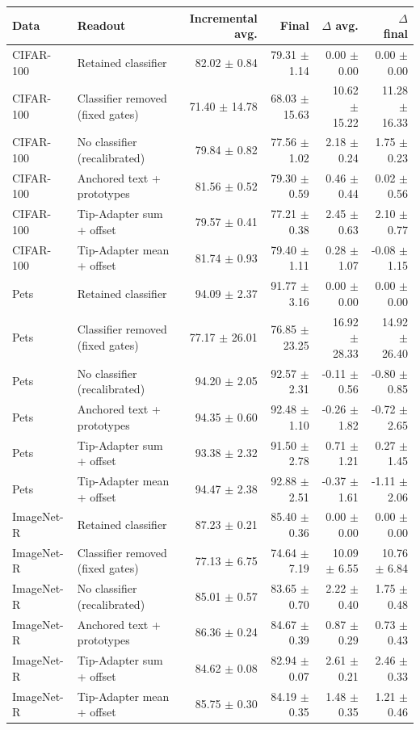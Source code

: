 \begin{tabular}{llrrrr}
\toprule
Data & Readout & Incremental avg. & Final & $\Delta$ avg. & $\Delta$ final \\
\midrule
CIFAR-100 & Retained classifier & 82.02 $\pm$ 0.84 & 79.31 $\pm$ 1.14 & 0.00 $\pm$ 0.00 & 0.00 $\pm$ 0.00 \\
CIFAR-100 & Classifier removed (fixed gates) & 71.40 $\pm$ 14.78 & 68.03 $\pm$ 15.63 & 10.62 $\pm$ 15.22 & 11.28 $\pm$ 16.33 \\
CIFAR-100 & No classifier (recalibrated) & 79.84 $\pm$ 0.82 & 77.56 $\pm$ 1.02 & 2.18 $\pm$ 0.24 & 1.75 $\pm$ 0.23 \\
CIFAR-100 & Anchored text + prototypes & 81.56 $\pm$ 0.52 & 79.30 $\pm$ 0.59 & 0.46 $\pm$ 0.44 & 0.02 $\pm$ 0.56 \\
CIFAR-100 & Tip-Adapter sum + offset & 79.57 $\pm$ 0.41 & 77.21 $\pm$ 0.38 & 2.45 $\pm$ 0.63 & 2.10 $\pm$ 0.77 \\
CIFAR-100 & Tip-Adapter mean + offset & 81.74 $\pm$ 0.93 & 79.40 $\pm$ 1.11 & 0.28 $\pm$ 1.07 & -0.08 $\pm$ 1.15 \\
\midrule
Pets & Retained classifier & 94.09 $\pm$ 2.37 & 91.77 $\pm$ 3.16 & 0.00 $\pm$ 0.00 & 0.00 $\pm$ 0.00 \\
Pets & Classifier removed (fixed gates) & 77.17 $\pm$ 26.01 & 76.85 $\pm$ 23.25 & 16.92 $\pm$ 28.33 & 14.92 $\pm$ 26.40 \\
Pets & No classifier (recalibrated) & 94.20 $\pm$ 2.05 & 92.57 $\pm$ 2.31 & -0.11 $\pm$ 0.56 & -0.80 $\pm$ 0.85 \\
Pets & Anchored text + prototypes & 94.35 $\pm$ 0.60 & 92.48 $\pm$ 1.10 & -0.26 $\pm$ 1.82 & -0.72 $\pm$ 2.65 \\
Pets & Tip-Adapter sum + offset & 93.38 $\pm$ 2.32 & 91.50 $\pm$ 2.78 & 0.71 $\pm$ 1.21 & 0.27 $\pm$ 1.45 \\
Pets & Tip-Adapter mean + offset & 94.47 $\pm$ 2.38 & 92.88 $\pm$ 2.51 & -0.37 $\pm$ 1.61 & -1.11 $\pm$ 2.06 \\
\midrule
ImageNet-R & Retained classifier & 87.23 $\pm$ 0.21 & 85.40 $\pm$ 0.36 & 0.00 $\pm$ 0.00 & 0.00 $\pm$ 0.00 \\
ImageNet-R & Classifier removed (fixed gates) & 77.13 $\pm$ 6.75 & 74.64 $\pm$ 7.19 & 10.09 $\pm$ 6.55 & 10.76 $\pm$ 6.84 \\
ImageNet-R & No classifier (recalibrated) & 85.01 $\pm$ 0.57 & 83.65 $\pm$ 0.70 & 2.22 $\pm$ 0.40 & 1.75 $\pm$ 0.48 \\
ImageNet-R & Anchored text + prototypes & 86.36 $\pm$ 0.24 & 84.67 $\pm$ 0.39 & 0.87 $\pm$ 0.29 & 0.73 $\pm$ 0.43 \\
ImageNet-R & Tip-Adapter sum + offset & 84.62 $\pm$ 0.08 & 82.94 $\pm$ 0.07 & 2.61 $\pm$ 0.21 & 2.46 $\pm$ 0.33 \\
ImageNet-R & Tip-Adapter mean + offset & 85.75 $\pm$ 0.30 & 84.19 $\pm$ 0.35 & 1.48 $\pm$ 0.35 & 1.21 $\pm$ 0.46 \\
\bottomrule
\end{tabular}
